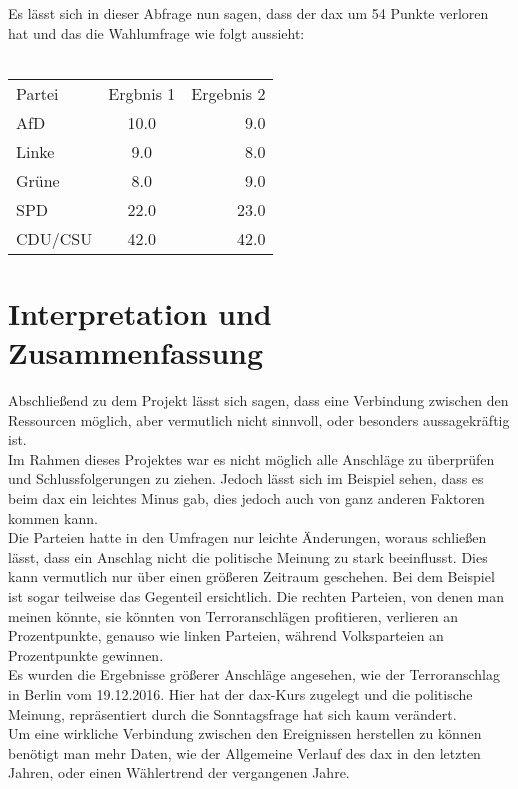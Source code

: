 \documentclass[a4paper,10pt,parskip]{article}
\begin{document}
Es lässt sich in dieser Abfrage nun sagen, dass der \ac{dax} um 54 Punkte verloren hat und das die Wahlumfrage wie folgt aussieht:\\
\\
\begin{tabular}{lcr}
 
 Partei & Ergbnis 1 & Ergebnis 2 \\ 
 AfD & 10.0 & 9.0 \\
 Linke & 9.0 & 8.0 \\
 Grüne & 8.0 & 9.0 \\
 SPD & 22.0 & 23.0 \\
 CDU/CSU & 42.0 & 42.0 \\
 

 
\end{tabular}

\section{Interpretation und Zusammenfassung}\label{Interpretation}
Abschließend zu dem Projekt lässt sich sagen, dass eine Verbindung zwischen den Ressourcen möglich, aber vermutlich nicht sinnvoll, oder besonders aussagekräftig ist. \\
Im Rahmen dieses Projektes war es nicht möglich alle Anschläge zu überprüfen und Schlussfolgerungen zu ziehen. Jedoch lässt sich im Beispiel sehen, dass es beim \ac{dax} ein leichtes Minus gab, dies jedoch auch von ganz anderen Faktoren kommen kann.\\
Die Parteien hatte in den Umfragen nur leichte Änderungen, woraus schließen lässt, dass ein Anschlag nicht die politische Meinung zu stark beeinflusst. Dies kann vermutlich nur über einen größeren Zeitraum geschehen. Bei dem Beispiel ist sogar teilweise das Gegenteil ersichtlich. Die rechten Parteien, von denen man meinen könnte, sie könnten von Terroranschlägen profitieren, verlieren an Prozentpunkte, genauso wie linken Parteien, während Volksparteien an Prozentpunkte gewinnen.\\
Es wurden die Ergebnisse größerer Anschläge angesehen, wie der Terroranschlag in Berlin vom 19.12.2016. Hier hat der \ac{dax}-Kurs zugelegt und die politische Meinung, repräsentiert durch die Sonntagsfrage hat sich kaum verändert.\\
Um eine wirkliche Verbindung zwischen den Ereignissen herstellen zu können benötigt man mehr Daten, wie der Allgemeine Verlauf des \ac{dax} in den letzten Jahren, oder einen Wählertrend der vergangenen Jahre.
\end{document}
